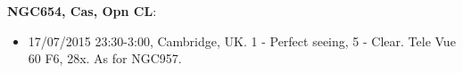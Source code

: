 {\bf NGC654, Cas, Opn CL}:
\begin{itemize}
\item 17/07/2015 23:30-3:00, Cambridge, UK. 1 - Perfect seeing, 5 - Clear. Tele Vue 60 F6, 28x. As for NGC957.
\end{itemize}
